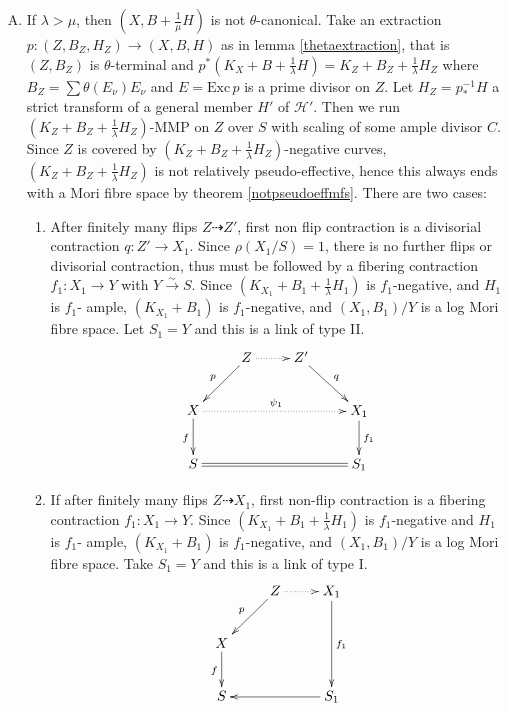 \documentclass{article}
\begin{document}
\begin{enumerate}[(A)]
\item\label{b} If $ \lambda>\mu $, then $ (X,B+\frac{1}{\mu}H) $ is not $ \theta $-canonical. Take  an extraction $ p:(Z,B_Z,H_Z)\to (X,B,H) $ as in lemma \ref{thetaextraction}, that is  $ (Z,B_Z) $ is $ \theta $-terminal and $ p^*(K_X+B+\frac{1}{\lambda}H)=K_Z+B_Z+\frac{1}{\lambda}H_Z $ where $ B_Z=\sum\theta(E_\nu)E_\nu $ and $ E=\mathrm{Exc}\,p $ is a prime divisor on $ Z $.  Let $ H_Z=p^{-1}_*H $ a strict transform of a general member $ H' $ of $ \mathcal{H}' $. Then we run $ (K_Z+B_Z+\frac{1}{\lambda}H_Z) $-MMP on $ Z $ over $ S $ with scaling of some ample divisor $C$. Since $Z$ is covered by $ (K_Z+B_Z+\frac{1}{\lambda}H_Z) $-negative curves, $ (K_Z+B_Z+\frac{1}{\lambda}H_Z) $ is not relatively pseudo-effective, hence this always ends with a Mori fibre space by theorem \ref{notpseudoeffmfs}. There are two cases:
  \begin{enumerate}[1)]
    \item \label{b1}After finitely many flips $ Z\dashrightarrow Z' $, first non flip contraction is a divisorial contraction $ q:Z'\to X_1 $. Since $ \rho(X_1/S)=1 $, there is no further flips or divisorial contraction, thus must be followed by a fibering contraction $ f_1:X_1\to Y $ with $ Y\xrightarrow{\sim}S $. Since $ (K_{X_1}+B_1+\frac{1}{\lambda}H_1) $ is $ f_1 $-negative, and $ H_1 $ is $ f_1 $- ample, $ (K_{X_1}+B_1) $ is $ f_1 $-negative, and $ (X_1,B_1)/Y $ is a log Mori fibre space.  Let $ S_1=Y $ and this is a link of type II.
    \[ \xymatrix{
      &Z\ar[ld]_p\ar@{.>}[r]&Z'\ar[dr]^{q}&\\
      X\ar[d]_{f}\ar@{.>}[rrr]^{\psi_1}&&&X_1\ar[d]^{f_1}\\
      S\ar@{=}[rrr]&&&S_1} \]
    \item\label{b2} If after finitely many flips $ Z\dashrightarrow X_1 $, first non-flip contraction is a fibering contraction $ f_1:X_1\to Y  $. Since $ (K_{X_1}+B_1+\frac{1}{\lambda}H_1) $ is $ f_1 $-negative and $ H_1 $ is $ f_1 $- ample, $ (K_{X_1}+B_1) $ is $ f_1 $-negative, and $ (X_1,B_1)/Y $ is a log Mori fibre space.  Take $ S_1=Y $ and this is a link of type I.
    \[
      \xymatrix{
      &Z\ar[ld]_p\ar@{.>}[r]&X_1\ar[dd]^{f_1}\\
        X\ar[d]_f&&\\
      S &&S_1\ar[ll]}
    \]
  \end{enumerate} 
\end{enumerate}



\end{document}
